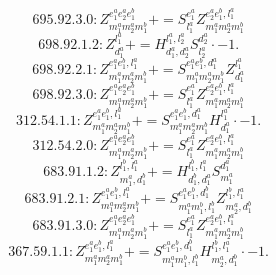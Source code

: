 \documentclass[letterpaper,10pt,fleqn,leqno,onecolumn]{article}
\begin{document}
\begin{equation} \;\;\;\;\;\;  695.92.3.0: Z^{e_{1}^{a}e_{2}^{a}e_{1}^{b}}_{m_{1}^{a}m_{2}^{a}m_{1}^{b}}+=S^{e_{1}^{a}}_{l_{1}^{a}}Z^{e_{2}^{a}e_{1}^{b},l_{1}^{a}}_{m_{1}^{a}m_{2}^{a}m_{1}^{b}} \end{equation}
\begin{equation} \;\;\;\;\;\;  698.92.1.2: Z^{l_{1}^{a}}_{d_{1}^{a}}+=H^{l_{1}^{a},l_{2}^{a}}_{d_{1}^{a},d_{2}^{a}}S^{d_{2}^{a}}_{l_{2}^{a}}\cdot -1. \end{equation}
\begin{equation} \;\;\;\;\;\;  698.92.2.1: Z^{e_{1}^{a}e_{1}^{b},l_{1}^{a}}_{m_{1}^{a}m_{2}^{a}m_{1}^{b}}+=S^{e_{1}^{a}e_{1}^{b},d_{1}^{a}}_{m_{1}^{a}m_{2}^{a}m_{1}^{b}}Z^{l_{1}^{a}}_{d_{1}^{a}} \end{equation}
\begin{equation} \;\;\;\;\;\;  698.92.3.0: Z^{e_{1}^{a}e_{2}^{a}e_{1}^{b}}_{m_{1}^{a}m_{2}^{a}m_{1}^{b}}+=S^{e_{1}^{a}}_{l_{1}^{a}}Z^{e_{2}^{a}e_{1}^{b},l_{1}^{a}}_{m_{1}^{a}m_{2}^{a}m_{1}^{b}} \end{equation}
\begin{equation} \;\;\;\;\;\;  312.54.1.1: Z^{e_{1}^{a}e_{1}^{b},l_{1}^{a}}_{m_{1}^{a}m_{2}^{a}m_{1}^{b}}+=S^{e_{1}^{a}e_{1}^{b},d_{1}^{a}}_{m_{1}^{a}m_{2}^{a}m_{1}^{b}}H^{l_{1}^{a}}_{d_{1}^{a}}\cdot -1. \end{equation}
\begin{equation} \;\;\;\;\;\;  312.54.2.0: Z^{e_{1}^{a}e_{2}^{a}e_{1}^{b}}_{m_{1}^{a}m_{2}^{a}m_{1}^{b}}+=S^{e_{1}^{a}}_{l_{1}^{a}}Z^{e_{2}^{a}e_{1}^{b},l_{1}^{a}}_{m_{1}^{a}m_{2}^{a}m_{1}^{b}} \end{equation}
\begin{equation} \;\;\;\;\;\;  683.91.1.2: Z^{l_{1}^{b},l_{1}^{a}}_{m_{1}^{a},d_{1}^{b}}+=H^{l_{1}^{b},l_{1}^{a}}_{d_{1}^{b},d_{1}^{a}}S^{d_{1}^{a}}_{m_{1}^{a}} \end{equation}
\begin{equation} \;\;\;\;\;\;  683.91.2.1: Z^{e_{1}^{a}e_{1}^{b},l_{1}^{a}}_{m_{1}^{a}m_{2}^{a}m_{1}^{b}}+=S^{e_{1}^{a}e_{1}^{b},d_{1}^{b}}_{m_{1}^{a}m_{1}^{b},l_{1}^{b}}Z^{l_{1}^{b},l_{1}^{a}}_{m_{2}^{a},d_{1}^{b}} \end{equation}
\begin{equation} \;\;\;\;\;\;  683.91.3.0: Z^{e_{1}^{a}e_{2}^{a}e_{1}^{b}}_{m_{1}^{a}m_{2}^{a}m_{1}^{b}}+=S^{e_{1}^{a}}_{l_{1}^{a}}Z^{e_{2}^{a}e_{1}^{b},l_{1}^{a}}_{m_{1}^{a}m_{2}^{a}m_{1}^{b}} \end{equation}
\begin{equation} \;\;\;\;\;\;  367.59.1.1: Z^{e_{1}^{a}e_{1}^{b},l_{1}^{a}}_{m_{1}^{a}m_{2}^{a}m_{1}^{b}}+=S^{e_{1}^{a}e_{1}^{b},d_{1}^{b}}_{m_{1}^{a}m_{1}^{b},l_{1}^{b}}H^{l_{1}^{b},l_{1}^{a}}_{m_{2}^{a},d_{1}^{b}}\cdot -1. \end{equation}
\end{document}
